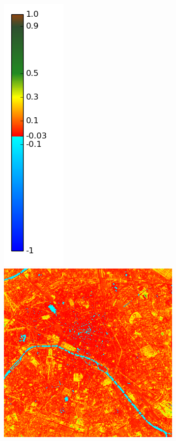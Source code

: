 \documentclass{book}
\begin{document}
\begin{figure}[H]
{\includegraphics[scale=0.2]{images/colormap.png}
\includegraphics[scale=0.25]{images/Paris/10_ndvi.png}
}
\end{figure}
\end{document}
